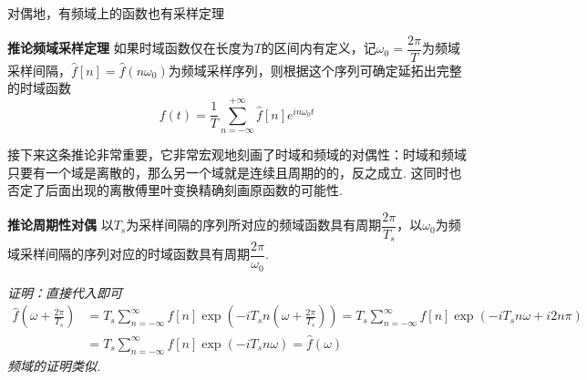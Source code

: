 \documentclass[UTF8]{ctexart}
\newenvironment{corollary}[1]
    {\begin{tcolorbox}[enhanced, colback=LightYellow, breakable=true, frame hidden, borderline west={1.5mm}{-2mm}{Brown}]
    {\bfseries {\color{Brown} 推论}\quad #1} \newline}
    {\end{tcolorbox}}
\begin{document}
对偶地，有频域上的函数也有采样定理
\begin{corollary}{频域采样定理}
    如果时域函数仅在长度为\(T\)的区间内有定义，记\(\omega_0=\dfrac{2\pi}{T}\)为频域采样间隔，\(\hat{f}[n]=\hat{f}(n\omega_0)\)为频域采样序列，则根据这个序列可确定延拓出完整的时域函数
    \[f(t)=\frac{1}{T}\sum_{n=-\infty}^{+\infty}\hat{f}[n]e^{in\omega_0t}\]
\end{corollary}

接下来这条推论非常重要，它非常宏观地刻画了时域和频域的对偶性：时域和频域只要有一个域是离散的，那么另一个域就是连续且周期的的，反之成立. 这同时也否定了后面出现的离散傅里叶变换精确刻画原函数的可能性.

\begin{corollary}{周期性对偶}
    以\(T_s\)为采样间隔的序列所对应的频域函数具有周期\(\dfrac{2\pi}{T_s}\)，以\(\omega_0\)为频域采样间隔的序列对应的时域函数具有周期\(\dfrac{2\pi}{\omega_0}\).
\end{corollary}
\textit{
    证明：直接代入即可
    \begin{align*}
        \hat{f}\left(\omega+\frac{2\pi}{T_s}\right) &= T_s \sum_{n=-\infty}^{\infty}f[n]\exp\left(-iT_sn(\omega+\frac{2\pi}{T_s})\right) = T_s \sum_{n=-\infty}^{\infty}f[n]\exp\left(-iT_sn\omega+i2n\pi\right) \\
        &= T_s \sum_{n=-\infty}^{\infty}f[n]\exp(-iT_sn\omega) = \hat{f}(\omega)
    \end{align*}
    频域的证明类似.
}
\vspace{1.0cm}
\end{document}
